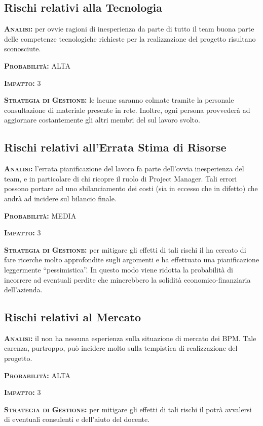 \subsection{Rischi relativi alla Tecnologia}
\begin{description}
	\item{\scshape\bfseries Analisi:} per ovvie ragioni di inesperienza da parte di tutto il team buona parte delle competenze tecnologiche richieste per la realizzazione del progetto risultano sconosciute.
	\item{\scshape\bfseries Probabilità:} ALTA 
	\item{\scshape\bfseries Impatto:} 3 
	\item{\scshape\bfseries Strategia di Gestione:} le lacune saranno colmate tramite la personale consultazione di materiale presente in rete. Inoltre, ogni persona provvederà ad aggiornare costantemente gli altri membri del  sul lavoro svolto.
	
	
	
\subsection{Rischi relativi all'Errata Stima di Risorse}
\begin{description}
	\item{\scshape\bfseries Analisi:} l'errata pianificazione del lavoro fa parte dell'ovvia inesperienza del team, e in particolare di chi ricopre il ruolo di Project Manager. Tali errori possono portare ad uno sbilanciamento dei costi (sia in eccesso che in difetto) che andrà ad incidere sul bilancio finale.
	\item{\scshape\bfseries Probabilità:} MEDIA
	\item{\scshape\bfseries Impatto:} 3 
	\item{\scshape\bfseries Strategia di Gestione:} per mitigare gli effetti di tali rischi il  ha cercato di fare ricerche molto approfondite sugli argomenti e ha effettuato una pianificazione leggermente ``pessimistica''. In questo modo viene ridotta la probabilità di incorrere ad eventuali perdite che minerebbero la solidità economico-finanziaria dell'azienda.
\end{description}	
	
	
\subsection{Rischi relativi al Mercato}
\begin{description}
	\item{\scshape\bfseries Analisi:} il  non ha nessuna esperienza sulla situazione di mercato dei  BPM. Tale carenza, purtroppo, può incidere molto sulla tempistica di realizzazione del progetto.
	\item{\scshape\bfseries Probabilità:} ALTA
	\item{\scshape\bfseries Impatto:} 3 
	\item{\scshape\bfseries Strategia di Gestione:} per mitigare gli effetti di tali rischi il  potrà avvalersi di eventuali consulenti e dell'aiuto del docente.
\end{description}	
	
	

\end{description}


